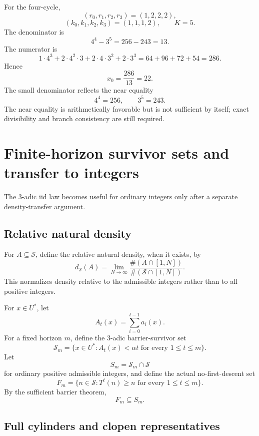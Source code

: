 \documentclass[11pt]{article}
\theoremstyle{definition}
\theoremstyle{remark}
\newcommand{\Sset}{\mathcal S}
\newcommand{\Ustar}{U^\ast}
\newcommand{\ds}{d_{\Sset}}
\begin{document}
For the four-cycle,
\[
(r_0,r_1,r_2,r_3)=(1,2,2,2),
\]
\[
(k_0,k_1,k_2,k_3)=(1,1,1,2),
\qquad K=5.
\]
The denominator is
\[
4^4-3^5=256-243=13.
\]
The numerator is
\[
1\cdot4^3
+2\cdot4^2\cdot3
+2\cdot4\cdot3^2
+2\cdot3^3
=
64+96+72+54=286.
\]
Hence
\[
x_0=\frac{286}{13}=22.
\]
The small denominator reflects the near equality
\[
4^4=256,\qquad3^5=243.
\]
The near equality is arithmetically favorable but is not sufficient by itself; exact divisibility and branch consistency are still required.

\section{Finite-horizon survivor sets and transfer to integers}
\label{sec:transfer}

The $3$-adic iid law becomes useful for ordinary integers only after a separate density-transfer argument.

\subsection{Relative natural density}

For $A\subseteq\Sset$, define the relative natural density, when it exists, by
\begin{equation}
\ds(A)
=
\lim_{N\to\infty}
\frac{\#(A\cap[1,N])}{\#(\Sset\cap[1,N])}.
\label{eq:reldensity}
\end{equation}
This normalizes density relative to the admissible integers rather than to all positive integers.

For $x\in\Ustar$, let
\[
A_t(x)=\sum_{i=0}^{t-1}a_i(x).
\]
For a fixed horizon $m$, define the $3$-adic barrier-survivor set
\begin{equation}
\mathcal S_m
=
\{x\in\Ustar:A_t(x)<\alpha t\text{ for every }1\le t\le m\}.
\label{eq:Smcal}
\end{equation}
Let
\[
S_m=\mathcal S_m\cap\Sset
\]
for ordinary positive admissible integers, and define the actual no-first-descent set
\begin{equation}
F_m
=
\{n\in\Sset:T^t(n)\ge n\text{ for every }1\le t\le m\}.
\label{eq:Fm}
\end{equation}
By the sufficient barrier theorem,
\begin{equation}
F_m\subseteq S_m.
\label{eq:FsubsetS}
\end{equation}

\subsection{Full cylinders and clopen representatives}
\end{document}
